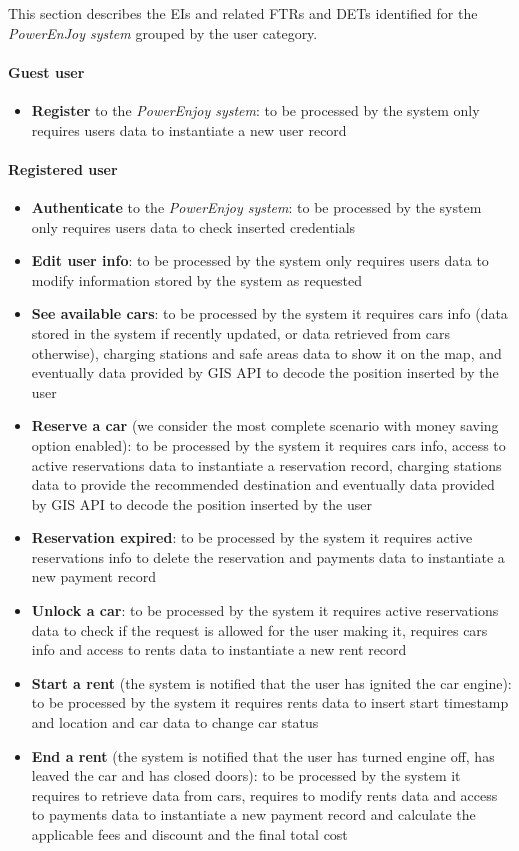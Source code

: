 This section describes the EIs and related FTRs and DETs identified for the \emph{PowerEnJoy system} grouped by the user category.

\paragraph{Guest user}
\begin{itemize}
	\item \textbf{Register} to the \emph{PowerEnjoy system}: to be processed by the system only requires users data to instantiate a new user record
\end{itemize}

\paragraph{Registered user}
\begin{itemize}
	\item \textbf{Authenticate} to the \emph{PowerEnjoy system}: to be processed by the system only requires users data to check inserted credentials
	\item \textbf{Edit user info}: to be processed by the system only requires users data to modify information stored by the system as requested
	\item \textbf{See available cars}: to be processed by the system it requires cars info (data stored in the system if recently updated, or data retrieved from cars otherwise), charging stations and safe areas data to show it on the map, and eventually data provided by GIS API to decode the position inserted by the user
	\item \textbf{Reserve a car} (we consider the most complete scenario with money saving option enabled): to be processed by the system it requires cars info, access to active reservations data to instantiate a reservation record, charging stations data to provide the recommended destination and eventually data provided by GIS API to decode the position inserted by the user
	\item \textbf{Reservation expired}: to be processed by the system it requires active reservations info to delete the reservation and payments data to instantiate a new payment record
	\item \textbf{Unlock a car}: to be processed by the system it requires active reservations data to check if the request is allowed for the user making it, requires cars info and access to rents data to instantiate a new rent record
	\item \textbf{Start a rent} (the system is notified that the user has ignited the car engine): to be processed by the system it requires rents data to insert start timestamp and location and car data to change car status
	\item \textbf{End a rent} (the system is notified that the user has turned engine off, has leaved the car and has closed doors): to be processed by the system it requires to retrieve data from cars, requires to modify rents data and access to payments data to instantiate a new payment record and calculate the applicable fees and discount and the final total cost
\end{itemize}


